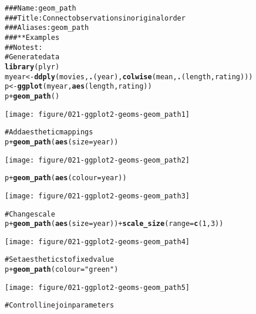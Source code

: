 \documentclass[a4paper,titlepage]{tufte-handout}\usepackage{graphicx, color}
\makeatletter
\def\maxwidth{ %
  \ifdim\Gin@nat@width>\linewidth
    \linewidth
  \else
    \Gin@nat@width
  \fi
}
\newcommand{\hlfunctioncall}[1]{\textcolor[rgb]{0.501960784313725,0,0.329411764705882}{\textbf{#1}}}%
\newcommand{\hlstring}[1]{\textcolor[rgb]{0.6,0.6,1}{#1}}%
\newcommand{\hlcomment}[1]{\textcolor[rgb]{0.180392156862745,0.6,0.341176470588235}{#1}}%
\newenvironment{kframe}{%
 \def\at@end@of@kframe{}%
 \ifinner\ifhmode%
  \def\at@end@of@kframe{\end{minipage}}%
  \begin{minipage}{\columnwidth}%
 \fi\fi%
 \def\FrameCommand##1{\hskip\@totalleftmargin \hskip-\fboxsep
 \colorbox{shadecolor}{##1}\hskip-\fboxsep
     \hskip-\linewidth \hskip-\@totalleftmargin \hskip\columnwidth}%
 \MakeFramed {\advance\hsize-\width
   \@totalleftmargin\z@ \linewidth\hsize
   \@setminipage}}%
 {\par\unskip\endMakeFramed%
 \at@end@of@kframe}
\newenvironment{knitrout}{}{} %
\makeatother
\begin{document}
\begin{knitrout}
\color{fgcolor}\begin{kframe}
\begin{alltt}
\hlcomment{### Name: geom_path}
\hlcomment{### Title: Connect observations in original order}
\hlcomment{### Aliases: geom_path}
\hlcomment{### ** Examples}
\hlcomment{## No test: }
\hlcomment{# Generate data}
\hlfunctioncall{library}(plyr)
myear <- \hlfunctioncall{ddply}(movies, \hlfunctioncall{.}(year), \hlfunctioncall{colwise}(mean, \hlfunctioncall{.}(length, rating)))
p <- \hlfunctioncall{ggplot}(myear, \hlfunctioncall{aes}(length, rating))
p + \hlfunctioncall{geom_path}()
\end{alltt}
\end{kframe}\texttt{[image: figure/021-ggplot2-geoms-geom\_path1]} \begin{kframe}\begin{alltt}
\hlcomment{# Add aesthetic mappings}
p + \hlfunctioncall{geom_path}(\hlfunctioncall{aes}(size = year))
\end{alltt}
\end{kframe}\texttt{[image: figure/021-ggplot2-geoms-geom\_path2]} \begin{kframe}\begin{alltt}
p + \hlfunctioncall{geom_path}(\hlfunctioncall{aes}(colour = year))
\end{alltt}
\end{kframe}\texttt{[image: figure/021-ggplot2-geoms-geom\_path3]} \begin{kframe}\begin{alltt}
\hlcomment{# Change scale}
p + \hlfunctioncall{geom_path}(\hlfunctioncall{aes}(size = year)) + \hlfunctioncall{scale_size}(range = \hlfunctioncall{c}(1, 3))
\end{alltt}
\end{kframe}\texttt{[image: figure/021-ggplot2-geoms-geom\_path4]} \begin{kframe}\begin{alltt}
\hlcomment{# Set aesthetics to fixed value}
p + \hlfunctioncall{geom_path}(colour = \hlstring{"green"})
\end{alltt}
\end{kframe}\texttt{[image: figure/021-ggplot2-geoms-geom\_path5]} \begin{kframe}\begin{alltt}
\hlcomment{# Control line join parameters}

\end{alltt}
\end{kframe}
\end{knitrout}
\end{document}
